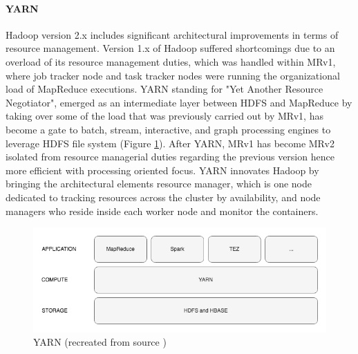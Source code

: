 \documentclass[review]{elsarticle}
\begin{document}
\paragraph{YARN}Hadoop version 2.x includes significant architectural improvements in terms of resource management. Version 1.x of Hadoop suffered shortcomings due to an overload of its resource management duties, which was handled within MRv1, where job tracker node and task tracker nodes were running the organizational load of MapReduce executions. YARN standing for "Yet Another Resource Negotiator", emerged as an intermediate layer between HDFS and MapReduce by taking over some of the load that was previously carried out by MRv1, has become a gate to batch, stream, interactive, and graph processing engines to leverage HDFS file system (Figure \ref{fig:YARNoverview}). After YARN, MRv1 has become MRv2 isolated from resource managerial duties regarding the previous version hence more efficient with processing oriented focus. YARN innovates Hadoop by bringing the architectural elements resource manager, which is one node dedicated to tracking resources across the cluster by availability, and node managers who reside inside each worker node and monitor the containers.


\begin{figure}[h!]
	\caption{YARN (recreated from source \cite{dean_mapreduce_2004})}
	\label{fig:YARNoverview}
	\includegraphics[width=\textwidth]{YARNoverview}
	\centering
\end{figure}
\end{document}
